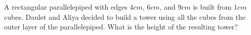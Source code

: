 A rectangular parallelepiped with edges $4cm$, $6cm$, and $9cm$ is built from $1cm$ cubes. Daulet and Aliya decided to build a tower using all the cubes from the outer layer of the parallelepiped. What is the height of the resulting tower?

